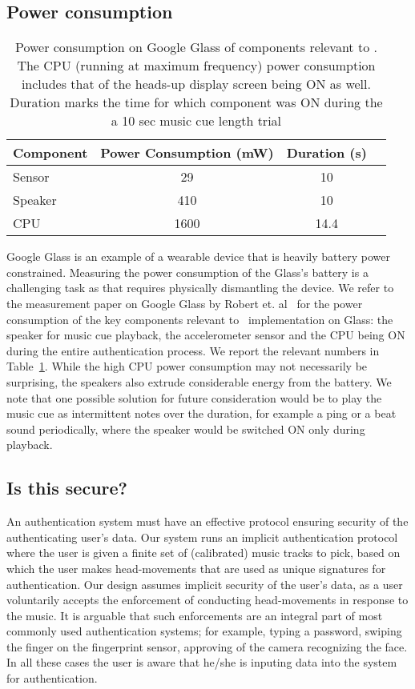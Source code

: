 \subsection{Power consumption}

\begin{table}
\begin{tabular}{lccc}
\hline
Component    & Power Consumption (mW) & Duration (s)       \\ \hline\hline
Sensor  & 29                    & 10       \\
Speaker & 410                    & 10      \\
CPU      & 1600                   & 14.4 \\ \hline
\end{tabular}
\caption{Power consumption on Google Glass of components relevant to 
\systemname.  The CPU (running at 
maximum frequency) power consumption includes that of the heads-up display 
screen being ON as well. Duration marks the time for which
component was ON during the a 10 sec music cue length trial}
\label{tab:pow}
\end{table}

Google Glass is an example of a wearable device that is heavily battery power 
constrained. Measuring the power consumption of the Glass's battery is a 
challenging task as that requires physically dismantling the device. 
We refer to the measurement paper on Google Glass by Robert et. 
al~\cite{likamwa2014draining} for the power consumption of the 
key components relevant to \systemname~implementation on Glass: the speaker 
for music cue playback, the accelerometer sensor and the CPU being ON during 
the entire authentication process. We report the relevant numbers in 
Table~\ref{tab:pow}. While the high CPU power consumption may not necessarily 
be surprising, the speakers also extrude considerable energy from the battery. 
We note that one possible solution for future consideration would be to play 
the music cue as intermittent notes over the duration, for example a ping or a 
beat sound periodically, where the speaker would be switched ON only during 
playback.

\subsection{Is this secure?}
An authentication system must have an effective protocol ensuring security of 
the authenticating user's data. Our system runs an implicit
authentication protocol where the user is given a finite set of (calibrated) 
music tracks to pick, based on which the user makes head-movements that are 
used as unique signatures for authentication.
Our design assumes implicit security of the user's data, as a
user voluntarily accepts the enforcement of conducting head-movements  
in response to the music. It is arguable that such enforcements are an 
integral part of most commonly used authentication systems; for example, 
typing a password, swiping the finger on the fingerprint sensor, approving of 
the camera recognizing the face. In all these cases the user is aware 
that he/she is inputing data into the system for authentication.

